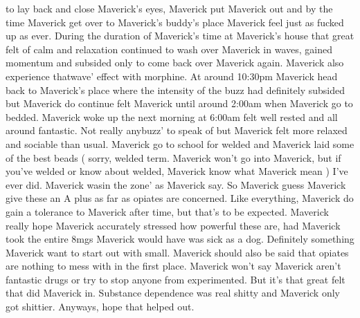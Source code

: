 \documentclass[12pt]{book}
\begin{document}
to lay back and close Maverick's eyes, Maverick put Maverick out and by the time Maverick get over to Maverick's buddy's place Maverick feel just as fucked up as ever. During the duration of Maverick's time at Maverick's house that great felt of calm and relaxation continued to wash over Maverick in waves, gained momentum and subsided only to come back over Maverick again. Maverick also experience thatwave' effect with morphine. At around 10:30pm Maverick head back to Maverick's place where the intensity of the buzz had definitely subsided but Maverick do continue felt Maverick until around 2:00am when Maverick go to bedded. Maverick woke up the next morning at 6:00am felt well rested and all around fantastic. Not really anybuzz' to speak of but Maverick felt more relaxed and sociable than usual. Maverick go to school for welded and Maverick laid some of the best beads ( sorry, welded term. Maverick won't go into Maverick, but if you've welded or know about welded, Maverick know what Maverick mean ) I've ever did. Maverick wasin the zone' as Maverick say. So Maverick guess Maverick give these an A plus as far as opiates are concerned. Like everything, Maverick do gain a tolerance to Maverick after time, but that's to be expected. Maverick really hope Maverick accurately stressed how powerful these are, had Maverick took the entire 8mgs Maverick would have was sick as a dog. Definitely something Maverick want to start out with small. Maverick should also be said that opiates are nothing to mess with in the first place. Maverick won't say Maverick aren't fantastic drugs or try to stop anyone from experimented. But it's that great felt that did Maverick in. Substance dependence was real shitty and Maverick only got shittier. Anyways, hope that helped out.
\end{document}
